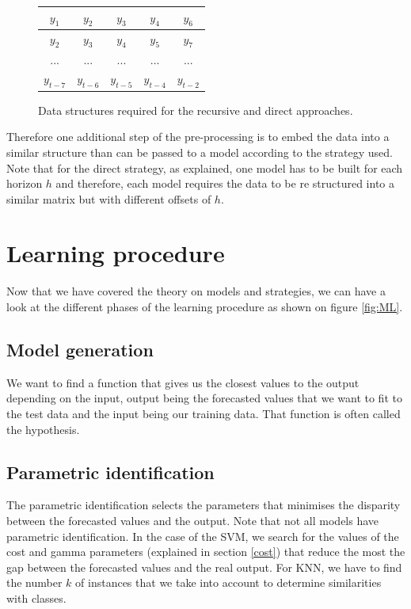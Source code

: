 \documentclass[11pt,a4paper,oneside]{book}
\begin{document}
\begin{figure}[!h]
\begin{minipage}{\textwidth}
\begin{minipage}{0.5\textwidth}
\begin{center}
\begin{footnotesize}
\begin{tabular}{|cccc|c|}
   $y_{1}$ & $y_{2}$ & $y_{3}$ & $y_{4}$ & $y_{6}$ \\ \hline
   $y_{2}$ & $y_{3}$ & $y_{4}$ & $y_{5}$ & $y_{7}$ \\ \hline
   $...$ & $...$ & $...$ & $...$ & $...$ \\ \hline
   $y_{t-7}$ & $y_{t-6}$ & $y_{t-5}$ & $y_{t-4}$ & $y_{t-2}$ \\ \hline
   \end{tabular}
   \end{footnotesize}
\end{center}
\end{minipage}
\end{minipage}
\caption{Data structures required for the recursive and direct approaches.}
\label{fig:recursive}
\end{figure}


Therefore one additional step of the pre-processing is to embed the data into a similar structure than can be passed to a model according to the strategy used. Note that for the direct strategy, as explained, one model has to be built for each horizon $h$ and therefore, each model requires the data to be re structured into a similar matrix but with different offsets of $h$.



\section{Learning procedure}

Now that we have covered the theory on models and strategies, we can have a look at the different phases of the learning procedure as shown on figure \ref{fig:ML}.


\subsection{Model generation}

We want to find a function that gives us the closest values to the output depending on the input, output being the forecasted values that we want to fit to the test data and the input being our training data. That function is often called the hypothesis. \cite{BenTaieb}


\subsection{Parametric identification}

The parametric identification selects the parameters that minimises the disparity between the forecasted values and the output. Note that not all models have parametric identification. In the case of the SVM, we search for the values of the cost and gamma parameters (explained in section \ref{cost}) that reduce the most the gap between the forecasted values and the real output. For KNN, we have to find the number $k$ of instances that we take into account to determine similarities with classes. \cite{BenTaieb}
\end{document}
